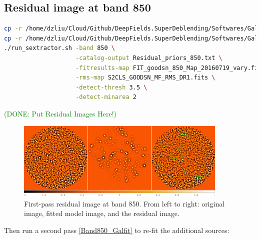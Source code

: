 \documentclass[11pt,a4paper]{article}
\begin{document}
\subsection{Residual image at band 850}
\label{Band850_Galres}

\begin{lstlisting}[language=bash]
cp -r /home/dzliu/Cloud/Github/DeepFields.SuperDeblending/Softwares/Galfit_Template_v20160225/run_sextractor .
cp -r /home/dzliu/Cloud/Github/DeepFields.SuperDeblending/Softwares/Galfit_Template_v20160225/run_sextractor.sh .
./run_sextractor.sh -band 850 \
                    -catalog-output Residual_priors_850.txt \
                    -fitresults-map FIT_goodsn_850_Map_20160719_vary.fits \
                    -rms-map S2CLS_GOODSN_MF_RMS_DR1.fits \
                    -detect-thresh 3.5 \
                    -detect-minarea 2
\end{lstlisting}

\textcolor{green}{(DONE: Put Residual Images Here!)}

\begin{figure}[H]
	\caption{First-pass residual image at band 850. From left to right: original image, fitted model image, and the residual image.}
	\includegraphics[width=0.9\textwidth]{galfit_850_FIT_goodsn_850_Map_20160719_vary_without_additional_sources}
\end{figure}

Then run a second pass \ref{Band850_Galfit} to re-fit the additional sources: 
\end{document}
